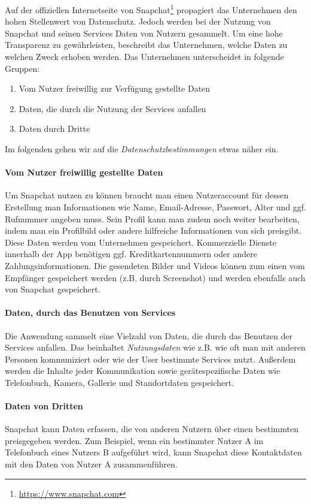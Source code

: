 Auf der offiziellen Internetseite von
Snapchat\footnote{\url{https://www.snapchat.com}} propagiert das Unternehmen
den hohen Stellenwert von Datenschutz. Jedoch werden bei der Nutzung von
Snapchat und seinen Services Daten von Nutzern gesammelt. Um eine hohe
Transparenz zu gew\"ahrleisten, beschreibt das Unternehmen, welche Daten zu
welchen Zweck erhoben werden. Das Unternehmen unterscheidet in folgende
Gruppen:
\begin{enumerate}
	\item Vom Nutzer freiwillig zur Verf\"ugung gestellte Daten
	\item Daten, die durch die Nutzung der Services anfallen
	\item Daten durch Dritte
\end{enumerate}
Im folgenden gehen wir auf die \emph{Datenschutzbestimmungen} etwas
n\"aher ein.

\paragraph{Vom Nutzer freiwillig gestellte Daten}
Um Snapchat nutzen zu k\"onnen braucht man einen Nutzeraccount f\"ur dessen
Erstellung man Informationen wie Name, Email-Adresse, Passwort, Alter und ggf.
Rufnummer angeben muss. Sein Profil kann man zudem noch weiter bearbeiten,
indem man ein Profilbild oder andere hilfreiche Informationen von sich
preisgibt. Diese Daten werden vom Unternehmen gespeichert. Kommerzielle Dienste
innerhalb der App ben\"otigen ggf.  Kreditkartennummern oder andere
Zahlungsinformationen. Die gesendeten Bilder und Videos k\"onnen zum einen
vom Empf\"anger gespeichert werden (z.B. durch Screenshot) und werden ebenfalls
auch von Snapchat gespeichert.

\paragraph{Daten, durch das Benutzen von Services}
Die Anwendung sammelt eine Vielzahl von Daten, die durch das Benutzen der
Services anfallen. Das beinhaltet \emph{Nutzungsdaten} wie z.B. wie oft man mit
anderen Personen kommuniziert oder wie der User bestimmte Services nutzt.
Au{\ss}erdem werden die Inhalte jeder Kommunikation sowie ger\"atespezifische
Daten wie Telefonbuch, Kamera, Gallerie und Standortdaten gespeichert.

\paragraph{Daten von Dritten}
Snapchat kann Daten erfassen, die von anderen Nutzern \"uber einen bestimmten
preisgegeben werden. Zum Beispiel, wenn ein bestimmter Nutzer A im Telefonbuch
eines Nutzers B aufgef\"uhrt wird, kann Snapchat diese Kontaktdaten mit den
Daten von Nutzer A zusammenf\"uhren.

